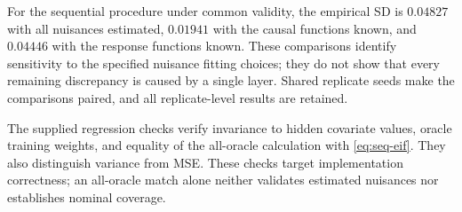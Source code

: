 For the sequential procedure under common validity, the empirical SD is $0.04827$ with all nuisances estimated, $0.01941$ with the causal functions known, and $0.04446$ with the response functions known. These comparisons identify sensitivity to the specified nuisance fitting choices; they do not show that every remaining discrepancy is caused by a single layer. Shared replicate seeds make the comparisons paired, and all replicate-level results are retained.

The supplied regression checks verify invariance to hidden covariate values, oracle training weights, and equality of the all-oracle calculation with \cref{eq:seq-eif}. They also distinguish variance from MSE. These checks target implementation correctness; an all-oracle match alone neither validates estimated nuisances nor establishes nominal coverage.
